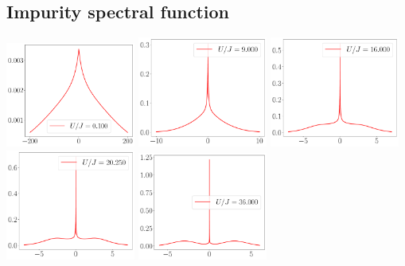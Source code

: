 \documentclass{report}
\numberwithin{equation}{section}
\begin{document}
\subsection*{Impurity spectral function}
\begin{center}
	\includegraphics[width=0.32\textwidth]{../figures/spec-func-gen-siam-U_by_J=0.100.pdf}
	\includegraphics[width=0.32\textwidth]{../figures/spec-func-gen-siam-U_by_J=9.000.pdf}
	\includegraphics[width=0.32\textwidth]{../figures/spec-func-gen-siam-U_by_J=16.000.pdf}
	\includegraphics[width=0.32\textwidth]{../figures/spec-func-gen-siam-U_by_J=20.250.pdf}
	\includegraphics[width=0.32\textwidth]{../figures/spec-func-gen-siam-U_by_J=36.000.pdf}
\end{center}
\end{document}
